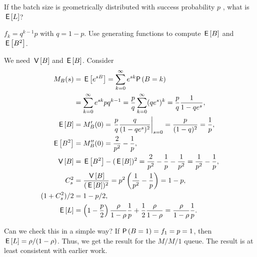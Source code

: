 \begin{exercise}
 If the batch size is geometrically distributed with success probability $p$ , what is $\,\mathsf{E}\left[L\right]$?
\begin{hint}
$f_k=q^{k-1}p$ with $q=1-p$. Use generating functions to compute $\,\mathsf{E}\left[B\right]$ and $\,\mathsf{E}\left[B^2\right]$.
\end{hint}
\begin{solution}
 We need $\,\mathsf{V}\left[B\right]$ and $\,\mathsf{E}\left[B\right]$. Consider
 \begin{align*}
 M_B(s) 
&= \E{e^{sB}} = \sum_{k=0}^\infty e^{sk} \P{B=k} \\
&= \sum_{k=0}^\infty e^{sk} p q^{k-1} 
= \frac p q \sum_{k=0}^\infty (q e^s)^k = \frac p q \frac1{1-qe^s},\\
 \E B &= M_B'(0) = \left.\frac p q \frac q{(1-q e^s)^2}\right|_{s=0}= \frac p{(1-q)^2} = \frac 1 p,\\
 \E{B^2} &= M_B''(0) = \frac2{p^2} - \frac1p, \\
 \V B &= \E{B^2} - (\E B)^2 = \frac2{p^2} - \frac1p - \frac1{p^2} = \frac1{p^2}-\frac1p,\\
 C_s^2&= \frac{\V B}{(\E B)^2} = p^2 \left(\frac1{p^2}-\frac1p\right)=1-p,\\
 (1+C_s^2)/2 &= 1-p/2,\\
 \E L &= 
\left(1-\frac p2\right) \frac\rho{1-\rho} \frac 1 p + \frac12\frac\rho{1-\rho}
=\frac\rho{1-\rho} \frac 1 p.
\end{align*}

Can we check this in a simple way? If $\P{B=1}=f_1 = p =1$, then
$\,\mathsf{E}\left[L\right]=\rho/(1-\rho)$. Thus, we get the result for the $M/M/1$
queue. The result is at least consistent with earlier work.
\end{solution}
\end{exercise}

